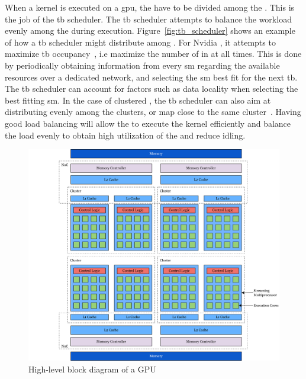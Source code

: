 When a kernel is executed on a \acrshort{gpu}, the  have to be divided among the . This is the job of the \acrshort{tb} scheduler. The \acrshort{tb} scheduler attempts to balance the workload evenly among the  during execution. Figure~\ref{fig:tb_scheduler} shows an example of how a \acrshort{tb} scheduler might distribute  among . For Nvidia , it attempts to maximize \acrshort{tb} occupancy~\cite{CTA_scheduling}, i.e maximize the number of  in  at all times. This is done by periodically obtaining information from every \acrshort{sm} regarding the available resources over a dedicated network, and selecting the \acrshort{sm} best fit for the next \acrshort{tb}. The \acrshort{tb} scheduler can account for factors such as data locality when selecting the best fitting \acrshort{sm}. In the case of clustered , the \acrshort{tb} scheduler can also aim at distributing  evenly among the clusters, or map close  to the same cluster~\cite{wang2020modeling}. Having good load balancing will allow the  to execute the kernel efficiently and balance the load evenly to obtain high utilization of the  and reduce idling.

\begin{figure}
    \centering
    \includegraphics[width=1.0\textwidth]{figures/generic-gpu.png}
    \caption{High-level block diagram of a GPU}
    \label{fig:generic-gpu}
\end{figure}

